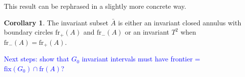\documentclass[10pt, oneside]{article}
\theoremstyle{definition}
\newtheorem{cor}{Corollary}
\theoremstyle{definition}
\begin{document}
This result can be rephrased in a slightly more concrete way.

\begin{cor}
    The invariant subset $\bar{A}$ is either an invariant closed annulus with boundary circles $\text{fr}_+(A)$ and $\text{fr}_-(A)$ or an invariant $T^2$ when $\text{fr}_-(A) = \text{fr}_+(A)$.
\end{cor}
\textcolor{blue}{Next steps: show that $G_0$ invariant intervals must have frontier = $\text{fix}(G_0)\cap\text{fr}(A)$?}

\listoftodos[Notes]
\end{document}
